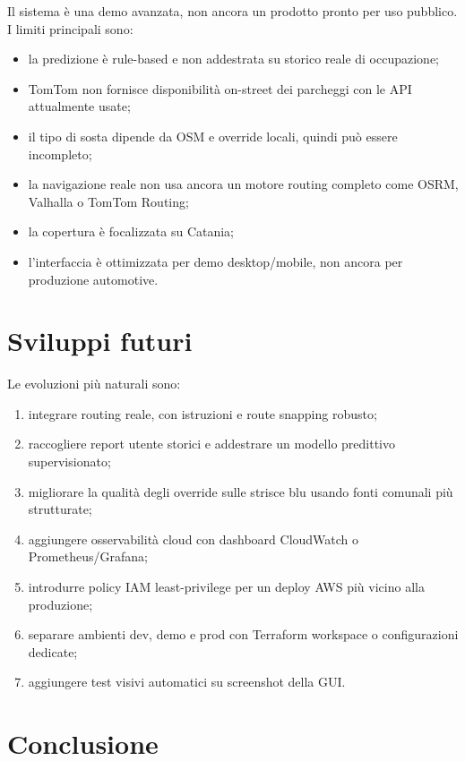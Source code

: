\documentclass[11pt,a4paper]{article}
\begin{document}
Il sistema \`e una demo avanzata, non ancora un prodotto pronto per uso pubblico. I limiti principali sono:

\begin{itemize}
  \item la predizione \`e rule-based e non addestrata su storico reale di occupazione;
  \item TomTom non fornisce disponibilit\`a on-street dei parcheggi con le API attualmente usate;
  \item il tipo di sosta dipende da OSM e override locali, quindi pu\`o essere incompleto;
  \item la navigazione reale non usa ancora un motore routing completo come OSRM, Valhalla o TomTom Routing;
  \item la copertura \`e focalizzata su Catania;
  \item l'interfaccia \`e ottimizzata per demo desktop/mobile, non ancora per produzione automotive.
\end{itemize}

\section{Sviluppi futuri}

Le evoluzioni pi\`u naturali sono:

\begin{enumerate}
  \item integrare routing reale, con istruzioni e route snapping robusto;
  \item raccogliere report utente storici e addestrare un modello predittivo supervisionato;
  \item migliorare la qualit\`a degli override sulle strisce blu usando fonti comunali pi\`u strutturate;
  \item aggiungere osservabilit\`a cloud con dashboard CloudWatch o Prometheus/Grafana;
  \item introdurre policy IAM least-privilege per un deploy AWS pi\`u vicino alla produzione;
  \item separare ambienti dev, demo e prod con Terraform workspace o configurazioni dedicate;
  \item aggiungere test visivi automatici su screenshot della GUI.
\end{enumerate}

\section{Conclusione}
\end{document}

